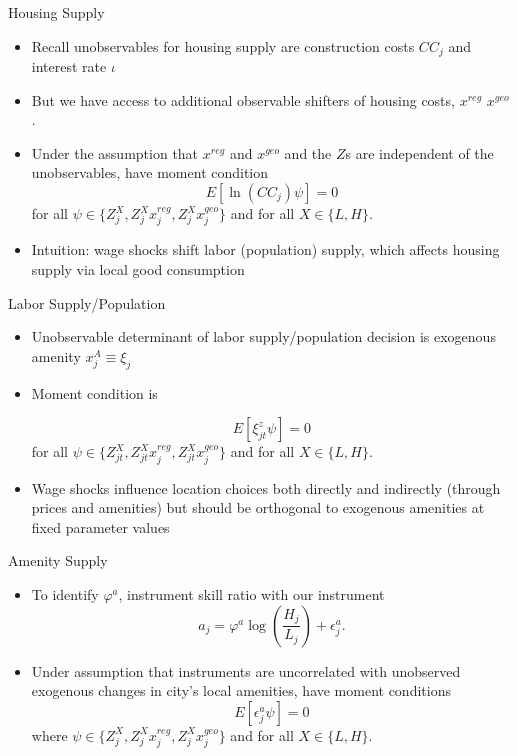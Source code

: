 \documentclass{beamer}
\begin{document}
\begin{frame}{Housing Supply}

 \begin{itemize}
     \item Recall unobservables for housing supply are construction costs $CC_j$ and interest rate $\iota$  
     \item But we have access to additional observable shifters of housing costs, $x^{reg}$ $x^{geo}$. 
     \item Under the assumption that $x^{reg}$ and $x^{geo}$ and the $Z$s are independent of the unobservables, have moment condition 
$$
E[ \ln (CC_{j}) \psi] = 0 
$$
for all $\psi \in \{ Z^X_{j},  Z_{j}^X x_j^{reg},  Z_{j}^X x_j^{geo}\}$ and for all $X\in\{L,H\}$.

\item Intuition: wage shocks shift labor (population) supply, which affects housing supply via local good consumption
     
 \end{itemize}

 \end{frame}


 \begin{frame}{Labor Supply/Population}

 \begin{itemize} \item Unobservable determinant of labor supply/population decision is exogenous amenity $x_j^A\equiv \xi_j$

 \item Moment condition is 

 $$
E[ \xi_{jt}^z \psi] = 0 
$$
for all $\psi \in \{ Z_{jt}^X,  Z_{jt}^X x_j^{reg},  Z_{jt}^X x_j^{geo}\}$ and for all $X\in\{L,H\}$.

\item Wage shocks influence location choices both directly and indirectly (through prices and amenities) but should be orthogonal to exogenous amenities at fixed parameter values

     
 \end{itemize}
\end{frame}

\begin{frame}{Amenity Supply}

 \begin{itemize}
    \item To identify $\varphi^a$, instrument skill ratio with our instrument  
$$ a_{j} = \varphi^a \log \left(\frac{H_{j}}{L_{j}}\right) + \epsilon^a_j.
$$
\item Under assumption that instruments are uncorrelated with unobserved exogenous changes in city's local amenities, have moment conditions
$$
E[\epsilon^a_{j} \psi] = 0$$
where $\psi \in \{ Z^X_{j}, Z_{j}^X x_j^{reg}, Z_{j}^X x_j^{geo}\}$ and for all $X\in\{L,H\}$.

 \end{itemize}

 \end{frame}
\end{document}
